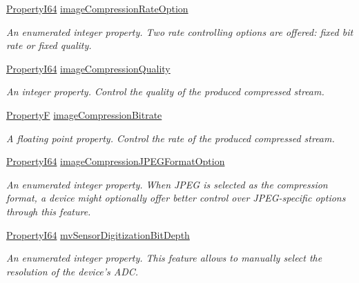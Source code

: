 \begin{DoxyCompactItemize}
\hyperlink{group___common_interface_ga81749b2696755513663492664a18a893}{Property\+I64} \hyperlink{classmv_i_m_p_a_c_t_1_1acquire_1_1_gen_i_cam_1_1_image_format_control_a22653a4407894a6665295887050343a2}{image\+Compression\+Rate\+Option}
\begin{DoxyCompactList}\small\item\em An enumerated integer property. Two rate controlling options are offered\+: fixed bit rate or fixed quality. \end{DoxyCompactList}\item 
\hyperlink{group___common_interface_ga81749b2696755513663492664a18a893}{Property\+I64} \hyperlink{classmv_i_m_p_a_c_t_1_1acquire_1_1_gen_i_cam_1_1_image_format_control_adb54973b40c5ad21e4ed201712de6e52}{image\+Compression\+Quality}
\begin{DoxyCompactList}\small\item\em An integer property. Control the quality of the produced compressed stream. \end{DoxyCompactList}\item 
\hyperlink{group___common_interface_gaf54865fe5a3d5cfd15f9a111b40d09f9}{Property\+F} \hyperlink{classmv_i_m_p_a_c_t_1_1acquire_1_1_gen_i_cam_1_1_image_format_control_abae73448ae7d81315f5094df43f6d098}{image\+Compression\+Bitrate}
\begin{DoxyCompactList}\small\item\em A floating point property. Control the rate of the produced compressed stream. \end{DoxyCompactList}\item 
\hyperlink{group___common_interface_ga81749b2696755513663492664a18a893}{Property\+I64} \hyperlink{classmv_i_m_p_a_c_t_1_1acquire_1_1_gen_i_cam_1_1_image_format_control_a44d90d8a836cb87ea44db50f47d53dd5}{image\+Compression\+J\+P\+E\+G\+Format\+Option}
\begin{DoxyCompactList}\small\item\em An enumerated integer property. When J\+P\+E\+G is selected as the compression format, a device might optionally offer better control over J\+P\+E\+G-\/specific options through this feature. \end{DoxyCompactList}\item 
\hyperlink{group___common_interface_ga81749b2696755513663492664a18a893}{Property\+I64} \hyperlink{classmv_i_m_p_a_c_t_1_1acquire_1_1_gen_i_cam_1_1_image_format_control_ac7618e267ca5f88f5a9c295069653fb1}{mv\+Sensor\+Digitization\+Bit\+Depth}
\begin{DoxyCompactList}\small\item\em An enumerated integer property. This feature allows to manually select the resolution of the device's A\+D\+C. \end{DoxyCompactList}\item 

\end{DoxyCompactItemize}
